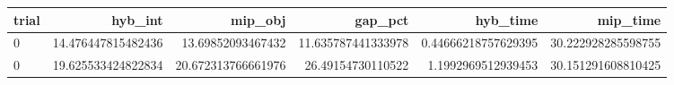 \begin{tabular}{lrrrrr}
\hline
trial & hyb_int & mip_obj & gap_pct & hyb_time & mip_time \\ \hline
0 & 14.476447815482436 & 13.69852093467432 & 11.635787441333978 & 0.44666218757629395 & 30.222928285598755 \\
0 & 19.625533424822834 & 20.672313766661976 & 26.49154730110522 & 1.1992969512939453 & 30.151291608810425 \\
\hline
\end{tabular}
